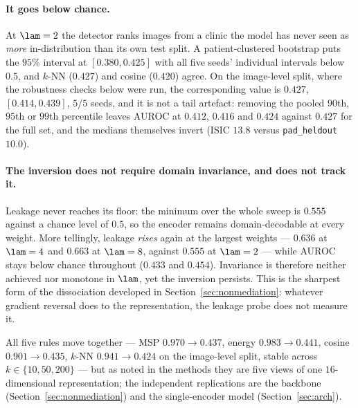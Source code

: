 \paragraph{It goes below chance.} At $\lam = 2$ the detector ranks images from a
clinic the model has never seen as \emph{more} in-distribution than its own test
split. A patient-clustered bootstrap puts the $95\%$ interval at $[0.380, 0.425]$
with all five seeds' individual intervals below $0.5$, and $k$-NN ($0.427$) and
cosine ($0.420$) agree. On the image-level split, where the robustness checks below
were run, the corresponding value is $0.427$, $[0.414, 0.439]$, $5/5$ seeds, and it
is not a tail artefact: removing the pooled $90$th, $95$th or $99$th percentile
leaves AUROC at $0.412$, $0.416$ and $0.424$ against $0.427$ for the full set, and
the medians themselves invert (ISIC $13.8$ versus \texttt{pad\_heldout} $10.0$).

\paragraph{The inversion does not require domain invariance, and does not track
it.} Leakage never reaches its floor: the minimum over the whole sweep is $0.555$
against a chance level of $0.5$, so the encoder remains domain-decodable at every
weight. More tellingly, leakage \emph{rises} again at the largest weights ---
$0.636$ at $\lam = 4$ and $0.663$ at $\lam = 8$, against $0.555$ at $\lam = 2$ ---
while AUROC stays below chance throughout ($0.433$ and $0.454$). Invariance is
therefore neither achieved nor monotone in $\lam$, yet the inversion persists. This
is the sharpest form of the dissociation developed in
Section~\ref{sec:nonmediation}: whatever gradient reversal does to the
representation, the leakage probe does not measure it.

All five rules move together --- MSP $0.970 \to 0.437$, energy $0.983 \to 0.441$,
cosine $0.901 \to 0.435$, $k$-NN $0.941 \to 0.424$ on the image-level split, stable
across $k \in \{10, 50, 200\}$ --- but as noted in the methods they are five views
of one $16$-dimensional representation; the independent replications are the
backbone (Section~\ref{sec:nonmediation}) and the single-encoder model
(Section~\ref{sec:arch}).

